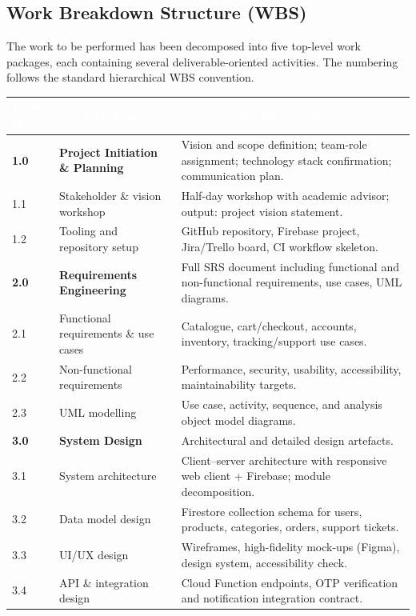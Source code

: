 \documentclass[11pt,a4paper]{article}
\begin{document}
\subsection{Work Breakdown Structure (WBS)}
\label{subsec:wbs}
The work to be performed has been decomposed into five top-level work
packages, each containing several deliverable-oriented activities.
The numbering follows the standard hierarchical WBS convention.

\renewcommand{\arraystretch}{1.2}
\begin{table}[H]
\centering
\small
\begin{tabular}{|p{}|p{}|p{}|}
\hline
\rowcolor{aybuHeader}
\textcolor{white}{\textbf{WBS ID}} &
\textcolor{white}{\textbf{Work Package}} &
\textcolor{white}{\textbf{Description / Deliverables}} \\ \hline

\rowcolor{aybuBlock}
\textbf{1.0} & \textbf{Project Initiation \& Planning} &
Vision and scope definition; team-role assignment; technology stack
confirmation; communication plan. \\ \hline
1.1 & Stakeholder \& vision workshop & Half-day workshop with academic
advisor; output: project vision statement. \\ \hline
1.2 & Tooling and repository setup & GitHub repository, Firebase
project, Jira/Trello board, CI workflow skeleton. \\ \hline

\rowcolor{aybuBlock}
\textbf{2.0} & \textbf{Requirements Engineering} & Full SRS document
including functional and non-functional requirements, use cases, UML
diagrams. \\ \hline
2.1 & Functional requirements \& use cases & Catalogue, cart/checkout,
accounts, inventory, tracking/support use cases. \\ \hline
2.2 & Non-functional requirements & Performance, security, usability,
accessibility, maintainability targets. \\ \hline
2.3 & UML modelling & Use case, activity, sequence, and analysis
object model diagrams. \\ \hline

\rowcolor{aybuBlock}
\textbf{3.0} & \textbf{System Design} & Architectural and detailed
design artefacts. \\ \hline
3.1 & System architecture & Client--server architecture with
responsive web client + Firebase; module decomposition. \\ \hline
3.2 & Data model design & Firestore collection schema for users,
products, categories, orders, support tickets. \\ \hline
3.3 & UI/UX design & Wireframes, high-fidelity mock-ups (Figma),
design system, accessibility check. \\ \hline
3.4 & API \& integration design & Cloud Function endpoints,
OTP verification and notification integration contract. \\ \hline


\end{tabular}
\end{table}
\end{document}
